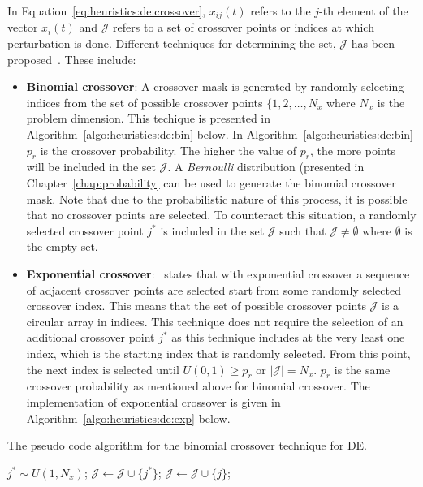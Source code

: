 In Equation~\ref{eq:heuristics:de:crossover}, $x_{ij}(t)$ refers to the $j$-th element of the vector $x_{i}(t)$ and $\mathcal{J}$ refers to a set of crossover points or indices at which perturbation is done. Different techniques for determining the set, $\mathcal{J}$ has been proposed~\cite{ref:storn:1996}\cite{ref:storn:1997}. These include:

\begin{itemize}
      \item \textbf{Binomial crossover}: A crossover mask is generated by randomly selecting indices from the set of possible crossover points $\{1,2,\dots,N_{x}$ where $N_{x}$ is the problem dimension. This techique is presented in Algorithm~\ref{algo:heuristics:de:bin} below. In Algorithm~\ref{algo:heuristics:de:bin} $p_{r}$ is the crossover probability. The higher the value of $p_{r}$, the more points will be included in the set $\mathcal{J}$. A \textit{Bernoulli} distribution (presented in Chapter~\ref{chap:probability} can be used to generate the binomial crossover mask. Note that due to the probabilistic nature of this process, it is possible that no crossover points are selected. To counteract this situation, a randomly selected crossover point $j^{*}$ is included in the set $\mathcal{J}$ such that $\mathcal{J} \neq \emptyset$ where $\emptyset$ is the empty set.
      \item \textbf{Exponential crossover}:~\citeauthor{ref:engelbrecht:2007}\cite{ref:engelbrecht:2007} states that with exponential crossover a sequence of adjacent crossover points are selected start from some randomly selected crossover index. This means that the set of possible crossover points $\mathcal{J}$ is a circular array in indices. This technique does not require the selection of an additional crossover point $j^{*}$ as this technique includes at the very least one index, which is the starting index that is randomly selected. From this point, the next index is selected until $U(0,1) \geq p_{r}$ or $|\mathcal{J}| = N_{x}$. $p_{r}$ is the same crossover probability as mentioned above for binomial crossover. The implementation of exponential crossover is given in Algorithm~\ref{algo:heuristics:de:exp} below.
\end{itemize}

\begin{algorithm}[H]
      \caption{The pseudo code algorithm for the binomial crossover technique for \ac{DE}.}
      \label{algo:heuristics:de:bin}
      \begin{algorithmic}
            \State $j^{*} \sim U(1,N_{x})$;
            \State $\mathcal{J} \gets \mathcal{J} \cup \{j^{*}\}$;
            \State $\mathcal{J} \gets \mathcal{J} \cup \{j\}$;
            \EndIf
            \EndFor
      \end{algorithmic}
\end{algorithm}

